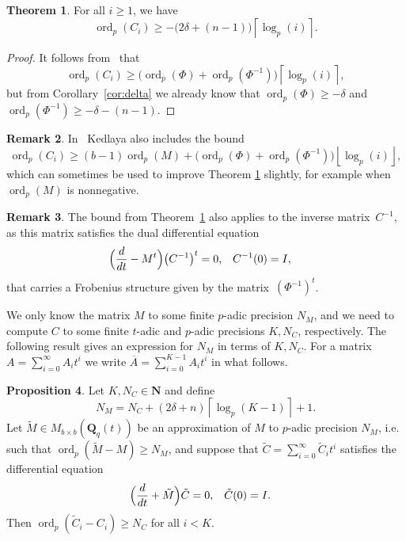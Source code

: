 \documentclass[a4paper,11pt]{article}
\numberwithin{equation}{section}
\providecommand{\floor}[1]{\left\lfloor#1\right\rfloor}   %
\providecommand{\ceil}[1]{\left\lceil#1\right\rceil}   %
\newcommand{\NN}{\mathbf{N}} %
\newcommand{\QQ}{\mathbf{Q}} %
\DeclareMathOperator{\ord}{ord}          %
\theoremstyle{definition}
\newtheorem{thm}{Theorem}[section]
\newtheorem{prop}[thm]{Proposition}
\newtheorem{rem}[thm]{Remark}
\begin{document}
\begin{thm} \label{thm:valC}
For all $i \geq 1$, we have
\begin{equation*}
\ord_p(C_i) \geq - \bigl(2 \delta + (n - 1)\bigr) \ceil{\log_p(i)}.
\end{equation*}
\end{thm}

\begin{proof}
It follows from~\citep[Theorem~{18.3.3}]{Kedlaya2010} that
\begin{equation*}
\ord_p(C_i) \geq \bigl( \ord_p(\Phi) + \ord_p(\Phi^{-1}) \bigr) \ceil{\log_p(i)},
\end{equation*}
but from Corollary~\ref{cor:delta} we already know that $\ord_p(\Phi) \geq -\delta$ and 
$\ord_p(\Phi^{-1}) \geq -\delta-(n-1)$.
\end{proof}

\begin{rem}
In~\citep[Remark~18.3.4]{Kedlaya2010} Kedlaya also includes the bound
\begin{equation*}
\ord_p(C_i) \geq (b - 1) \ord_p(M) 
            + \bigl( \ord_p(\Phi) + \ord_p(\Phi^{-1}) \bigr) \floor{\log_p(i)},
\end{equation*}
which can sometimes be used to improve Theorem \ref{thm:valC} 
slightly, for example when $\ord_p(M)$ is nonnegative.
\end{rem}

\begin{rem} \label{rem:Cinv}
The bound from Theorem~\ref{thm:valC} 
also applies to the inverse matrix~$C^{-1}$, as this matrix satisfies 
the dual differential equation 
\begin{align} \label{eq:01-GMDE-Dual}
\Bigl(\frac{d}{dt} - M^t\Bigr) \bigl(C^{-1}\bigr)^t &= 0, &C^{-1}(0)& = I,
\end{align}
that carries a Frobenius structure 
given by the matrix~$(\Phi^{-1})^t$.
\end{rem}

We only know the matrix $M$ to some finite $p$-adic precision 
$N_M$, and we need to compute $C$ to some finite $t$-adic and 
$p$-adic precisions $K,N_C$, respectively. The following result gives an 
expression for $N_M$ in terms of $K,N_C$. For a matrix 
$A=\sum_{i=0}^{\infty} A_i t^i$ we write 
$\overline{A}=\sum_{i=0}^{K-1} A_i t^i$ 
in what follows. 

\begin{prop} \label{prop:N_M}
Let $K,N_C \in \NN$ and define
\[
N_M= N_C + (2 \delta + n) \ceil{\log_p(K-1)}+1.
\]
Let $\tilde{M} \in M_{b \times b}(\QQ_q(t))$ be
an approximation of $M$ to $p$-adic precision $N_M$, i.e.
such that $\ord_p(\tilde{M}-M) \geq N_M$, and suppose that 
$\tilde{C}=\sum_{i=0}^{\infty} \tilde{C}_i t^i$ satisfies the
differential equation
\begin{align*}
\Bigl(\frac{d}{dt}+\tilde{M} \Bigr) \tilde{C}&=0, &\tilde{C}(0)=I&.
\end{align*}
Then $\ord_p(\tilde{C}_i-C_i) \geq N_C$ for all $i < K$.
\end{prop}
\end{document}
